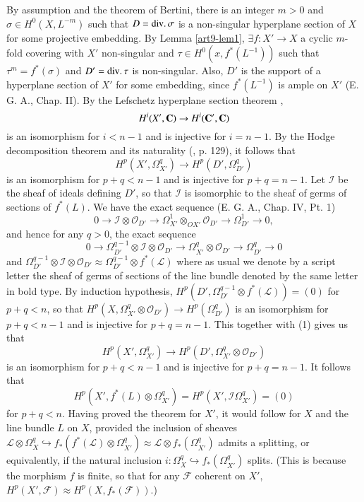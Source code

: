 By assumption and the theorem of Bertini, there is an integer $m>0$
and $\sigma \in H^0 (X, L^{-m})$ such that $D = \operatorname{div} \ldotp \sigma$
is a non-singular hyperplane section of $X$ for some projective
embedding. By Lemma \ref{art9-lem1}, $\exists f:X' \to X$ a cyclic $m$-fold covering
with $X'$ non-singular and $\tau \in H^0 (x,f^* (L^{-1}))$ such that
$\tau^m = f^* (\sigma)$ and $D' = \operatorname{div} \ldotp \tau$ is
non-singular. Also, $D'$ is the support of a hyperplane section of
$X'$ for some embedding, since $f^* (L^{-1})$ is ample on $X'$
(E. G. A., Chap. II). By the Lefschetz hyperplane section
theorem \cite{art9-key6},
$$
H^i (X', \mathbf{C}) \to H^i (\mathbf{C}', \mathbf{C})
$$
is an isomorphism for $i < n -1$ and is injective for $i=n-1$. By the Hodge decomposition theorem and its naturality (\cite{art9-key8}, p. 129), it follows that 
\begin{equation*}
H^p (X', \Omega^q_{X'}) \to H^p (D', \Omega^q_{D'}) \tag{1}
\end{equation*}\pageoriginale
is an isomorphism for $p+q < n -1$ and is injective for $p+q=n-1$. Let $\mathscr{I}$ be the sheaf of ideals defining $D'$, so that $\mathscr{I}$ is isomorphic to the sheaf of germs of sections of $f^*(L)$. We have the exact sequence (E. G. A., Chap. IV, Pt. 1)
$$
0 \to \mathscr{I} \otimes \mathscr{O}_{D'} \to \Omega^1_{X'} \otimes_{OX'} \mathscr{O}_{D'} \to \Omega^1_{D'} \to 0,
$$ 
and hence for any $q>0$, the exact sequence
$$
0 \to \Omega^{q-1}_{D'} \otimes \mathscr{I} \otimes \mathscr{O}_{D'} \to \Omega^q_{X'} \otimes \mathscr{O}_{D'}  \to \Omega^q_{D'} \to 0
$$
and $\Omega^{q-1}_{D'} \otimes \mathscr{I} \otimes \mathscr{O}_{D'} \approx \Omega^{q-1}_{D'} \otimes f^* (\mathscr{L})$ where as usual we denote by a script letter the sheaf of germs of sections of the line bundle denoted by the same letter in bold type. By induction hypothesis, $H^p (D',\Omega^{q-1}_{D'} \otimes f^* (\mathscr{L})) = (0)$ for $p+q<n$, so that $H^p (X, \Omega^q_{X'} \otimes \mathscr{O}_{D'}) \to H^p (\Omega^q_{D'})$ is an isomorphism for $p+q < n -1$ and is injective for $p+q = n-1$. This together with (1) gives us that
$$
H^p (X', \Omega^q_{X'}) \to H^p (D', \Omega^q_{X'} \otimes \mathscr{O}_{D'})
$$
is an isomorphism for $p+q<n-1$ and is injective for $p+q= n-1$. It follows that 
\begin{equation*}
H^p (X', f^* (L)\otimes \Omega^q_{X'}) = H^p (X', \mathscr{I} \Omega^q_{X'}) = (0)
\tag{2}
\end{equation*}
for $p+q<n$. Having proved the theorem for $X'$, it would follow for $X$ and the line bundle $L$ on $X$, provided the inclusion of sheaves $\mathscr{L} \otimes \Omega^q_X \hookrightarrow f_* (f^* (\mathscr{L}) \otimes \Omega^q_{X'}) \approx \mathscr{L} \otimes  f_* (\Omega^q_{X'})$ admits a splitting, or equivalently, if the natural inclusion $i: \Omega^q_X \hookrightarrow f_* (\Omega^q_{X'})$ splits. (This is because the morphism $f$ is finite, so that for any $\mathscr{F}$ coherent on $X'$, $H^p (X', \mathscr{F}) \approx H^p (X, f_* (\mathscr{F}))$.)

